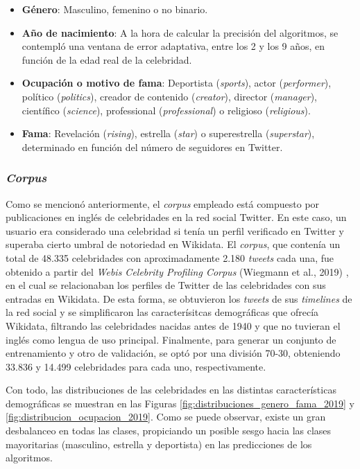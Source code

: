 \begin{itemize}
	\item \textbf{Género}: Masculino, femenino o no binario.
	\item \textbf{Año de nacimiento}: A la hora de calcular la precisión del algoritmos,
		se contempló una ventana de error adaptativa, entre los 2 y los 9 años, en función de la edad real de la celebridad. 
	\item \textbf{Ocupación o motivo de fama}: Deportista (\textit{sports}), actor (\textit{performer}), político (\textit{politics}), creador de contenido (\textit{creator}),
		director (\textit{manager}), científico (\textit{science}), professional (\textit{professional}) o religioso (\textit{religious}).
	\item \textbf{Fama}: Revelación (\textit{rising}), estrella (\textit{star}) o superestrella (\textit{superstar}), determinado en función del número de seguidores en Twitter.
\end{itemize}

\subsubsection{\textit{Corpus}}

Como se mencionó anteriormente, el \textit{corpus} empleado está compuesto por publicaciones en inglés de celebridades en la red social Twitter.
En este caso, un usuario era considerado una celebridad si tenía un perfil verificado en Twitter y superaba cierto umbral
de notoriedad en Wikidata. El \textit{corpus},
que contenía un total de 48.335 celebridades con aproximadamente 2.180 \textit{tweets} cada una, fue obtenido
a partir del \textit{Webis Celebrity Profiling Corpus} (Wiegmann et al., 2019) \cite{wiegmann2019celebrity}, en el cual se relacionaban los perfiles
de Twitter de las celebridades con sus entradas en Wikidata. De esta forma, se obtuvieron los \textit{tweets} de sus \textit{timelines} de la red social
y se simplificaron las caracterísitcas demográficas que ofrecía Wikidata, filtrando las celebridades nacidas antes de 1940 y que no tuvieran
el inglés como lengua de uso principal. Finalmente, para generar un conjunto de entrenamiento y otro de validación, se optó por una división
70-30, obteniendo 33.836 y 14.499 celebridades para cada uno, respectivamente.

\bigskip
Con todo, las distribuciones de las celebridades en las distintas características demográficas se muestran en las Figuras \ref{fig:distribuciones_genero_fama_2019}
y \ref{fig:distribucion_ocupacion_2019}. Como se puede observar, existe un gran desbalanceo en todas las clases, propiciando un posible sesgo
hacia las clases mayoritarias (masculino, estrella y deportista) en las predicciones de los algoritmos.

